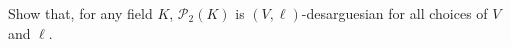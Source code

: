 Show that, for any field $K$, $\mathcal{P}_2(K)$ is $(V,\ell)$-desarguesian for all choices of $V$ and $\ell$.
